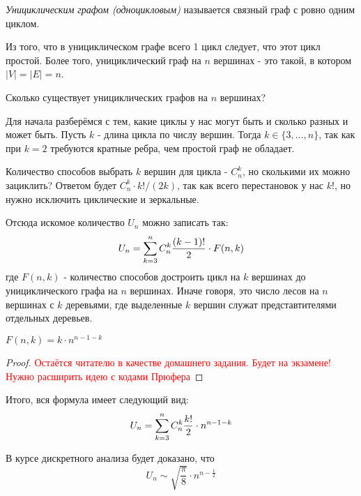 \begin{definition}
	\textit{Унициклическим графом (одноцикловым)} называется связный граф с ровно одним циклом.
\end{definition}

\begin{note}
	Из того, что в унициклическом графе всего 1 цикл следует, что этот цикл простой. Более того, унициклический граф на $n$ вершинах - это такой, в котором $|V| = |E| = n$.
\end{note}

\begin{example}
	Сколько существует унициклических графов на $n$ вершинах?
\end{example}

\begin{solution}
	Для начала разберёмся с тем, какие циклы у нас могут быть и сколько разных и может быть. Пусть $k$ - длина цикла по числу вершин. Тогда $k \in \{3, \ldots, n\}$, так как при $k = 2$ требуются кратные ребра, чем простой граф не обладает.
	
	Количество способов выбрать $k$ вершин для цикла - $C_n^k$, но сколькими их можно зациклить? Ответом будет $C_n^k \cdot k! / (2k)$, так как всего перестановок у нас $k!$, но нужно исключить циклические и зеркальные.
	
	Отсюда искомое количество $U_n$ можно записать так:
	\[
		U_n = \sum\limits_{k = 3}^n C_n^k \frac{(k - 1)!}{2} \cdot F(n, k)
	\]
	где $F(n, k)$ - количество способов достроить цикл на $k$ вершинах до унициклического графа на $n$ вершинах. Иначе говоря, это число лесов на $n$ вершинах с $k$ деревьями, где выделенные $k$ вершин служат представтителями отдельных деревьев.
	
	\begin{theorem}
		$F(n, k) = k \cdot n^{n - 1 - k}$
	\end{theorem}

	\begin{proof}
		\textcolor{red}{Остаётся читателю в качестве домашнего задания. Будет на экзамене! Нужно расширить идею с кодами Прюфера}
	\end{proof}

	Итого, вся формула имеет следующий вид:
	\[
		U_n = \sum\limits_{k = 3}^n C_n^k \frac{k!}{2} \cdot n^{n - 1 - k}
	\]
\end{solution}

\begin{corollary}
	В курсе дискретного анализа будет доказано, что
	\[
		U_n \sim \sqrt{\frac{\pi}{8}} \cdot n^{n - \frac{1}{2}}
	\]
\end{corollary}

